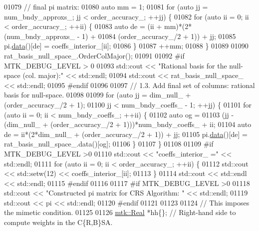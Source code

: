 \begin{DoxyCode}
{{01079   \textcolor{comment}{// final pi matrix:}
01080   \textcolor{keyword}{auto} mm = 1;
01081   \textcolor{keywordflow}{for} (\textcolor{keyword}{auto} jj = num\_bndy\_approxs\_; jj < order\_accuracy\_; ++jj) \{
01082     \textcolor{keywordflow}{for} (\textcolor{keyword}{auto} ii = 0; ii < order\_accuracy\_; ++ii) \{
01083       \textcolor{keyword}{auto} de = (ii + mm)*(2*(num\_bndy\_approxs\_ - 1) +
01084         (order\_accuracy\_/2 + 1)) + jj;
01085       pi.\hyperlink{classmtk_1_1DenseMatrix_a0c33b8a9e01d157c61ddbdf807c25d84}{data}()[de] = coeffs\_interior\_[ii];
01086     \}
01087     ++mm;
01088   \}
01089 
01090   rat\_basis\_null\_space\_.OrderColMajor();
01091 
01092 \textcolor{preprocessor}{  #if MTK\_DEBUG\_LEVEL > 0}
01093   std::cout << \textcolor{stringliteral}{"Rational basis for the null-space (col. major):"} << std::endl;
01094   std::cout << rat\_basis\_null\_space\_ << std::endl;
01095 \textcolor{preprocessor}{  #endif}
01096 
01097   \textcolor{comment}{// 1.3. Add final set of columns: rational basis for null-space.}
01098 
01099   \textcolor{keywordflow}{for} (\textcolor{keyword}{auto} jj = dim\_null\_ + (order\_accuracy\_/2 + 1);
01100        jj < num\_bndy\_coeffs\_ - 1; ++jj) \{
01101     \textcolor{keywordflow}{for} (\textcolor{keyword}{auto} ii = 0; ii < num\_bndy\_coeffs\_; ++ii) \{
01102       \textcolor{keyword}{auto} og =
01103         (jj - (dim\_null\_ + (order\_accuracy\_/2 + 1)))*num\_bndy\_coeffs\_ + ii;
01104       \textcolor{keyword}{auto} de = ii*(2*dim\_null\_ + (order\_accuracy\_/2 + 1)) + jj;
01105       pi.\hyperlink{classmtk_1_1DenseMatrix_a0c33b8a9e01d157c61ddbdf807c25d84}{data}()[de] = rat\_basis\_null\_space\_.data()[og];
01106     \}
01107   \}
01108 
01109 \textcolor{preprocessor}{  #if MTK\_DEBUG\_LEVEL >0}
01110   std::cout << \textcolor{stringliteral}{"coeffs\_interior\_ ="} << std::endl;
01111   \textcolor{keywordflow}{for} (\textcolor{keyword}{auto} ii = 0; ii < order\_accuracy\_; ++ii) \{
01112     std::cout << std::setw(12) << coeffs\_interior\_[ii];
01113   \}
01114   std::cout << std::endl << std::endl;
01115 \textcolor{preprocessor}{  #endif}
01116 
01117 \textcolor{preprocessor}{  #if MTK\_DEBUG\_LEVEL >0}
01118   std::cout << \textcolor{stringliteral}{"Constructed pi matrix for CRS Algorithm: "} << std::endl;
01119   std::cout << pi << std::endl;
01120 \textcolor{preprocessor}{  #endif}
01121 
01123 
01124   \textcolor{comment}{// This imposes the mimetic condition.}
01125 
01126   \hyperlink{group__c01-roots_gac080bbbf5cbb5502c9f00405f894857d}{mtk::Real} *hh\{\};  \textcolor{comment}{// Right-hand side to compute weights in the C\{R,B\}SA.}
}}
\end{DoxyCode}

